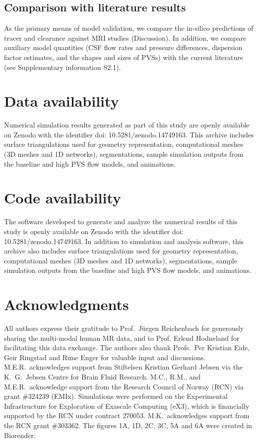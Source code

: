 \documentclass[fleqn,10pt]{wlscirep}
\providecommand{\DIFadd}[1]{{\protect\color{blue}\uwave{#1}}} %
\providecommand{\DIFaddbegin}{} %
\providecommand{\DIFaddend}{} %
\begin{document}
\subsection*{Comparison with literature results}

As the primary means of model validation, we compare the in-silico
predictions of tracer  \DIFaddbegin \DIFadd{distribution }\DIFaddend and clearance against
 \DIFaddbegin \DIFadd{contrast-enhanced }\DIFaddend MRI studies (Discussion). In addition, we compare
auxiliary model quantities (CSF flow rates and pressure differences,
dispersion factor estimates, and the shapes and sizes of PVSs) with
the current literature (see Supplementary information S2.1).

\section*{Data availability}

Numerical simulation results generated as part of this study are
openly available on Zenodo with the identifier doi:
10.5281/zenodo.14749163. This archive includes surface triangulations
used for geometry representation, computational meshes (3D meshes and
1D networks), segmentations, sample simulation outputs from the
baseline and high PVS flow models, and animations.

\section*{Code availability}

The software developed to generate and analyze the numerical results
of this study is openly available on Zenodo with the identifier doi:
10.5281/zenodo.14749163. In addition to simulation and analysis
software, this archive also includes surface triangulations used for
geometry representation, computational meshes (3D meshes and 1D
networks), segmentations, sample simulation outputs from the baseline
and high PVS flow models, and animations. 



\section*{Acknowledgments}

All authors express their gratitude to Prof.~Jürgen Reichenbach for
generously sharing the multi-modal human MR data, and to Prof. Erlend
Hodneland for facilitating this data exchange. The authors also thank
Profs.~Per Kristian Eide, Geir Ringstad and Rune Enger for valuable
input and discussions. M.E.R.~acknowledges support from Stiftelsen
Kristian Gerhard Jebsen via the K.~G.~Jebsen Centre for Brain Fluid
Research. M.C., R.M., and M.E.R.~acknowledge support from the Research
Council of Norway (RCN) via grant \#324239 (EMIx). Simulations were
performed on the Experimental Infrastructure for Exploration of
Exascale Computing (eX3), which is financially supported by the RCN
under contract 270053. M.K.~acknowledges support from the RCN grant
\#303362. The figures 1A, 1D, 2C, 3C, 5A and 6A were created in
Biorender.
\end{document}

